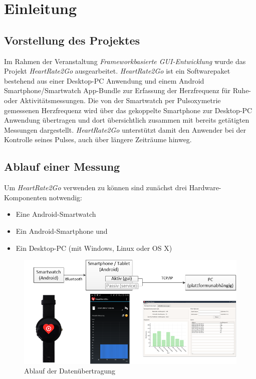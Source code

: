 \newpage
\section{Einleitung}
\label{sec:Einleitung}

\subsection{Vorstellung des Projektes}
\label{sec:Vorstellung des Projektes}
Im Rahmen der Veranstaltung \textit{Frameworkbasierte GUI-Entwicklung} wurde das Projekt \textit{HeartRate2Go} ausgearbeitet. \textit{HeartRate2Go} ist ein Softwarepaket bestehend aus einer Desktop-PC Anwendung und einem Android Smartphone/Smartwatch App-Bundle zur Erfassung der Herzfrequenz für Ruhe- oder Aktivitätsmessungen. Die von der Smartwatch per Pulsoxymetrie gemessenen Herzfrequenz wird über das gekoppelte Smartphone zur Desktop-PC Anwendung übertragen und dort übersichtlich zusammen mit bereits getätigten Messungen dargestellt. \textit{HeartRate2Go} unterstützt damit den Anwender bei der Kontrolle seines Pulses, auch über längere Zeiträume hinweg.

\subsection{Ablauf einer Messung}

Um \textit{HeartRate2Go} verwenden zu können sind zunächst drei Hardware-Komponenten notwendig:
\begin{itemize}
	\item Eine Android-Smartwatch
	\item Ein Android-Smartphone und
	\item Ein Desktop-PC (mit Windows, Linux oder OS X)
\end{itemize}

\begin{figure} [H]
	\centering
		\includegraphics[scale=0.5]{images/ablauf.png}
		\caption{Ablauf der Datenübertragung}
		\label{fig:ablauf}
\end{figure}


